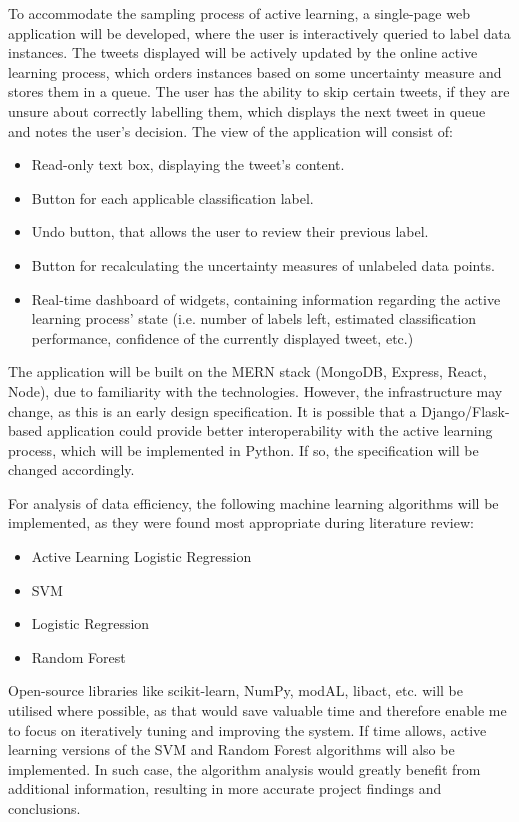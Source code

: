 \documentclass[a4paper,12pt]{article}
\begin{document}
To accommodate the sampling process of active learning, a single-page web application will be developed, where the user is interactively queried to label data instances. The tweets displayed will be actively updated by the online active learning process, which orders instances based on some uncertainty measure and stores them in a queue. The user has the ability to skip certain tweets, if they are unsure about correctly labelling them, which displays the next tweet in queue and notes the user's decision.
The view of the application will consist of:
\begin{itemize}
    \item Read-only text box, displaying the tweet's content.
    \item Button for each applicable classification label.
    \item Undo button, that allows the user to review their previous label.
    \item Button for recalculating the uncertainty measures of unlabeled data points.
    \item Real-time dashboard of widgets, containing information regarding the active learning process' state (i.e. number of labels left, estimated classification performance, confidence of the currently displayed tweet, etc.)
\end{itemize}
The application will be built on the MERN stack (MongoDB, Express, React, Node), due to familiarity with the technologies. However, the infrastructure may change, as this is an early design specification. It is possible that a Django/Flask-based application could provide better interoperability with the active learning process, which will be implemented in Python. If so, the specification will be changed accordingly.

For analysis of data efficiency, the following machine learning algorithms will be implemented, as they were found most appropriate during literature review:
\begin{itemize}
    \item Active Learning Logistic Regression
    \item SVM
    \item Logistic Regression
    \item Random Forest
\end{itemize}
Open-source libraries like scikit-learn, NumPy, modAL, libact, etc. will be utilised where possible, as that would save valuable time and therefore enable me to focus on iteratively tuning and improving the system.
If time allows, active learning versions of the SVM and Random Forest algorithms will also be implemented. In such case, the algorithm analysis would greatly benefit from additional information, resulting in more accurate project findings and conclusions.
\end{document}
